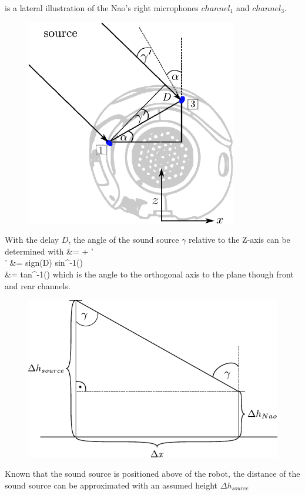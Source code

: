  is a lateral illustration of
the Nao's right microphones $channel_1$ and $channel_3$.
\begin{figure}[ht]
	\centering
		\includegraphics[width=0.45\columnwidth]{figures/side_head_tdoa}
	\caption{}
    \label{fig:02_headSideTdoa}
\end{figure}
With the delay $D$, the angle of the sound source $\gamma$ relative
to the Z-axis can be determined with
\bsub \bal
\gamma &= \alpha + \gamma'\\
\gamma' &= sign(D) \cdot sin^{-1}()\\
\alpha &= tan^{-1}()
\eal \esub
which is the angle to the orthogonal axis to the plane though
front and rear channels.
\begin{figure}[ht]
	\centering
		\includegraphics[width=0.6\columnwidth]{figures/x_distance}
	\caption{}
    \label{fig:02_xDistance}
\end{figure}
Known that the sound source is positioned above of the robot, the distance
of the sound source can be approximated with an assumed height $\Delta h_{source}$

